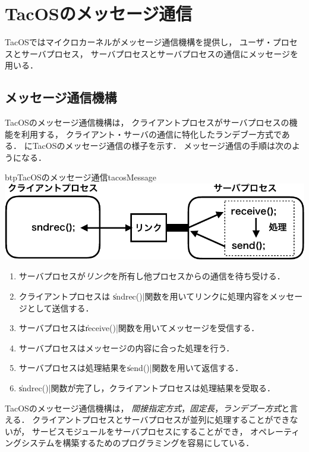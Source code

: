 \chapter{TacOSのメッセージ通信}
\label{tacosIPC}
TacOSではマイクロカーネルがメッセージ通信機構を提供し，
ユーザ・プロセスとサーバプロセス，
サーバプロセスとサーバプロセスの通信にメッセージを用いる．

\section{メッセージ通信機構}
TacOSのメッセージ通信機構は，
クライアントプロセスがサーバプロセスの機能を利用する，
クライアント・サーバの通信に特化したランデブー方式である．
にTacOSのメッセージ通信の様子を示す．
メッセージ通信の手順は次のようになる．

\begin{myfig}{btp}{TacOSのメッセージ通信}{tacosMessage}
  \includegraphics[scale=0.75]{Fig/tacosMessage-crop.pdf}
\end{myfig}

\begin{enumerate}
\item サーバプロセスが\emph{リンク}を所有し他プロセスからの通信を待ち受ける．
\item クライアントプロセスは
  \|sndrec()|関数を用いてリンクに処理内容をメッセージとして送信する．
  \item サーバプロセスは\|receive()|関数を用いてメッセージを受信する．
  \item サーバプロセスはメッセージの内容に合った処理を行う．
  \item サーバプロセスは処理結果を\|send()|関数を用いて返信する．
  \item \|sndrec()|関数が完了し，クライアントプロセスは処理結果を受取る．
\end{enumerate}

TacOSのメッセージ通信機構は，
\emph{間接指定方式}，\emph{固定長}，\emph{ランデブー方式}と言える．
クライアントプロセスとサーバプロセスが並列に処理することができないが，
サービスモジュールをサーバプロセスにすることができ，
オペレーティングシステムを構築するためのプログラミングを容易にしている．

